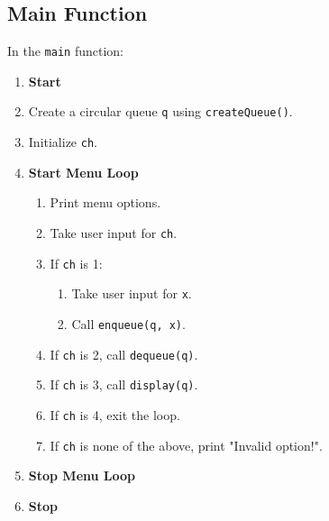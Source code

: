 {  \subsection{Main Function}
  In the \texttt{main} function:
  \begin{enumerate}[label=\arabic*:, start=1]
    \item \textbf{Start}
    \item Create a circular queue \texttt{q} using \texttt{createQueue()}.
    \item Initialize \texttt{ch}.
    \item \textbf{Start Menu Loop}
          \begin{enumerate}[label=4.\arabic*:, start=1]
            \item Print menu options.
            \item Take user input for \texttt{ch}.
            \item If \texttt{ch} is 1:
                  \begin{enumerate}[label=4.1.\arabic*:, start=1]
                    \item Take user input for \texttt{x}.
                    \item Call \texttt{enqueue(q, x)}.
                  \end{enumerate}
            \item If \texttt{ch} is 2, call \texttt{dequeue(q)}.
            \item If \texttt{ch} is 3, call \texttt{display(q)}.
            \item If \texttt{ch} is 4, exit the loop.
            \item If \texttt{ch} is none of the above, print "Invalid option!".
          \end{enumerate}
    \item \textbf{Stop Menu Loop}
    \item \textbf{Stop}
  \end{enumerate}

 }
